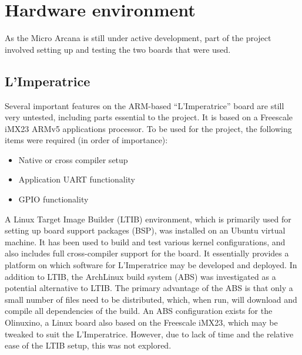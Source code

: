 




\section{Hardware environment} %
\label{sec:hardware_dev_env}
	As the Micro Arcana is still under active development, part of the project involved setting up and testing the two boards that were used.

	\subsection{L'Imperatrice} %
	\label{sub:l_imperatrice_env}
		Several important features on the ARM-based ``L'Imperatrice'' board are still very untested, including parts essential to the project.  It is based on a Freescale iMX23 ARMv5 applications processor.  To be used for the project, the following items were required (in order of importance):
		\begin{itemize}
			\item Native or cross compiler setup
			\item Application UART functionality
			\item GPIO functionality
		\end{itemize}

		A Linux Target Image Builder (LTIB)  environment, which is primarily used for setting up board support packages (BSP), was installed on an Ubuntu virtual machine.  It has been used to build and test various kernel configurations, and also includes full cross-compiler support for the board.  It essentially provides a platform on which software for L'Imperatrice may be developed and deployed.
		In addition to LTIB, the ArchLinux build system (ABS) was investigated as a potential alternative to LTIB.  The primary advantage of the ABS is that only a small number of files need to be distributed, which, when run, will download and compile all dependencies of the build.  An ABS configuration exists for the Olinuxino, a Linux board also based on the Freescale iMX23, which may be tweaked to suit the L'Imperatrice.  However, due to lack of time and the relative ease of the LTIB setup, this was not explored.

